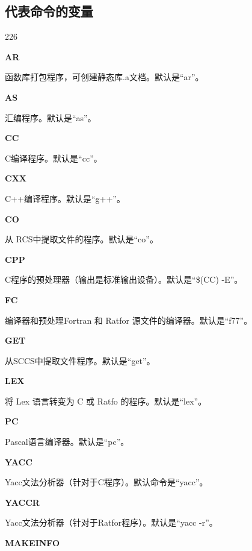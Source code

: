 \subsection{代表命令的变量}
\begin{dinglist}{226}
\itemsep=4pt

\item \textbf{AR}

函数库打包程序，可创建静态库.a文档。默认是“ar”。

\item \textbf{AS}

汇编程序。默认是“as”。

\item \textbf{CC}

C编译程序。默认是“cc”。

\item \textbf{CXX}

C++编译程序。默认是“g++”。

\item \textbf{CO}

从 RCS中提取文件的程序。默认是“co”。

\item \textbf{CPP}

C程序的预处理器（输出是标准输出设备）。默认是“\$(CC) -E”。

\item \textbf{FC}

编译器和预处理Fortran 和 Ratfor 源文件的编译器。默认是“f77”。

\item \textbf{GET}

从SCCS中提取文件程序。默认是“get”。

\item \textbf{LEX}

将 Lex 语言转变为 C 或 Ratfo 的程序。默认是“lex”。

\item \textbf{PC}

Pascal语言编译器。默认是“pc”。

\item \textbf{YACC}

Yacc文法分析器（针对于C程序）。默认命令是“yacc”。

\item \textbf{YACCR}

Yacc文法分析器（针对于Ratfor程序）。默认是“yacc -r”。

\item \textbf{MAKEINFO}


\end{dinglist}

